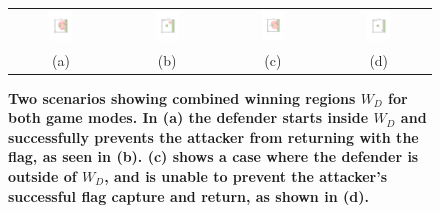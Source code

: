 \documentclass[letterpaper, 10 pt, conference]{ieeeconf}  %
\numberwithin{algorithm}{section}
\begin{document}
\setlength\tabcolsep{0.5pt}
\begin{figure}
	\centering
	\begin{tabular}{cccc}
		\includegraphics[width=0.25\textwidth]{figures/defenderWinFCFR/defenderWinFCFR1.pdf} &
		\includegraphics[width=0.25\textwidth]{figures/defenderWinFCFR/defenderWinFCFR2.pdf} &
		\includegraphics[width=0.25\textwidth]{figures/attackerWinFCFR/attackerwinFCFR1.pdf} &
		\includegraphics[width=0.25\textwidth]{figures/attackerWinFCFR/attackerwinFCFR2.pdf}\\
		(a) & (b) & (c) & (d)  \\
	\end{tabular} 
	\caption{\textbf{Two scenarios showing combined winning regions $W_D$ for both game modes.  In (a) the defender starts inside $W_D$ and successfully prevents the attacker from returning with the flag, as seen in (b).  (c) shows a case where the defender is outside of $W_D$, and is unable to prevent the attacker's successful flag capture and return, as shown in (d). }}
	\label{fig:combined}
\end{figure} 
\setlength\tabcolsep{6pt}
\end{document}
